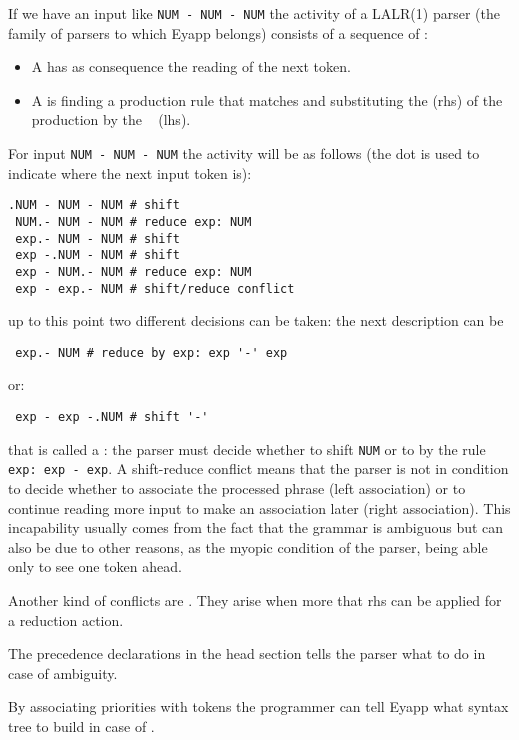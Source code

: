 If we
have an input like \verb|NUM - NUM - NUM| the activity of a LALR(1) parser
(the family of parsers to which Eyapp belongs)
consists of a sequence of :

\begin{itemize}
\item
A 
has as consequence the reading of the next token. 

\item
A 
is finding a production rule that matches and substituting 
the  (rhs) of the production by the \
 (lhs).  
\end{itemize}

For input \verb|NUM - NUM - NUM|
the activity will be as follows (the dot is used to indicate where the next 
input token is):


\begin{verbatim}
.NUM - NUM - NUM # shift
 NUM.- NUM - NUM # reduce exp: NUM 
 exp.- NUM - NUM # shift
 exp -.NUM - NUM # shift
 exp - NUM.- NUM # reduce exp: NUM
 exp - exp.- NUM # shift/reduce conflict
\end{verbatim}
up to this point two different decisions can be taken: the next description can be
\begin{verbatim}
 exp.- NUM # reduce by exp: exp '-' exp 
\end{verbatim}
or:
\begin{verbatim}
 exp - exp -.NUM # shift '-' 
\end{verbatim}
that is called a : the parser must decide
whether to shift \verb|NUM| or to \I{reduce} by the rule \verb|exp: exp - exp|.
A shift-reduce conflict means that the parser is not in condition to decide
whether to associate the processed phrase (left association) or to continue reading 
more input to make an association later (right association). This incapability
usually comes from the fact that the grammar is ambiguous but can also be due
to other reasons, as the myopic condition of the parser, being able only to see one token ahead.

Another kind of conflicts are .
They arise when more that rhs can be applied for a reduction
action.

The precedence declarations in the 
head section tells the parser what to do in case of ambiguity. 

By associating priorities with tokens
the programmer can tell Eyapp what syntax tree
to build in case of .


